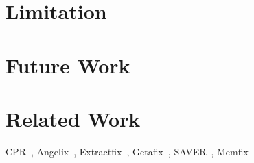 \documentclass[a4paper,11pt,oneside,openany]{book}
\begin{document}

\chapter{Limitation}

\chapter{Future Work}


\chapter{Related Work}
CPR~\cite{CPR}, Angelix~\cite{Angelix}, Extractfix~\cite{Extractfix}, Getafix~\cite{Getafix}, SAVER~\cite{SAVER}, Memfix~\cite{Memfix}



\end{document}

